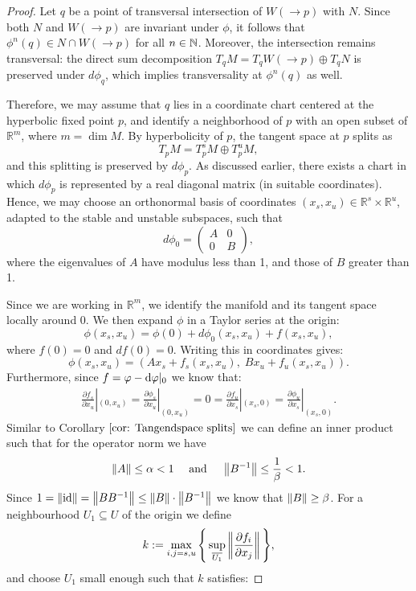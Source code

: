 	\begin{proof}
		Let \( q \) be a point of transversal intersection of \( W(\to p) \) with \( N \). Since both \( N \) and \( W(\to p) \) are invariant under \( \phi \), it follows that \( \phi^n(q) \in N \cap W(\to p) \) for all \( n \in \mathbb{N} \). Moreover, the intersection remains transversal: the direct sum decomposition \( T_q M = T_q W(\to p) \oplus T_q N \) is preserved under \( d\phi_q \), which implies transversality at \( \phi^n(q) \) as well.
		
		Therefore, we may assume that \( q \) lies in a coordinate chart centered at the hyperbolic fixed point \( p \), and identify a neighborhood of \( p \) with an open subset of \( \mathbb{R}^m \), where \( m = \dim M \). By hyperbolicity of \( p \), the tangent space at \( p \) splits as
		\[
		T_p M = T^s_p M \oplus T^u_p M,
		\]
		and this splitting is preserved by \( d\phi_p \). As discussed earlier, there exists a chart in which \( d\phi_p \) is represented by a real diagonal matrix (in suitable coordinates). Hence, we may choose an orthonormal basis of coordinates \( (x_s, x_u) \in \mathbb{R}^s \times \mathbb{R}^u \), adapted to the stable and unstable subspaces, such that
		\[
		d\phi_0 =
		\begin{pmatrix}
			A & 0 \\
			0 & B
		\end{pmatrix},
		\]
		where the eigenvalues of \( A \) have modulus less than 1, and those of \( B \) greater than 1.
		
		Since we are working in \( \mathbb{R}^m \), we identify the manifold and its tangent space locally around 0. We then expand \( \phi \) in a Taylor series at the origin:
		\[
		\phi(x_s, x_u) = \phi(0) + d\phi_0(x_s, x_u) + f(x_s, x_u),
		\]
		where \( f(0) = 0 \) and \( df(0) = 0 \). Writing this in coordinates gives:
		\begin{equation} \label{eq: proof of Lambda lemma phi split}
			\phi(x_s, x_u) = (A x_s + f_s(x_s, x_u),\; B x_u + f_u(x_s, x_u)).
		\end{equation}
  Furthermore, since $f=\varphi-\mathop{}\!\mathrm{d} \varphi|_0$ we know that: 
		\begin{align*}
			\frac{\partial f_s}{\partial x_u}|_{(0,x_u)}=\frac{\partial \phi_s}{\partial x_u}|_{(0,x_u)}=0=\frac{\partial f_u}{\partial x_s}|_{(x_s,0)}=\frac{\partial \phi_u}{\partial x_s}|_{(x_s,0)}.
		\end{align*} Similar to Corollary $\ref{cor: Tangendspace splits}$ we can define an inner product such that for the operator norm we have 
		\begin{align*}
			\left\lVert A\right\rVert\leq \alpha <1 \quad \text{ and } \quad \left\lVert B^{-1}\right\rVert\leq \frac{1}{\beta} <1.
		\end{align*}
		Since $1=\left\lVert\operatorname{\text{id}}\right\rVert=\left\lVert BB^{-1}\right\rVert\leq \left\lVert B\right\rVert\cdot \left\lVert B^{-1}\right\rVert$ we know that $\left\lVert B\right\rVert\geq \beta$.
		For a neighbourhood $U_1\subseteq U$ of the origin we define 
		\begin{align*}
			k:=\max_{i,j=s,u} \Bigg\{ \sup_{\overline{U_1}}\left\lVert\frac{\partial f_i}{\partial x_j}\right\rVert \Bigg\},
		\end{align*} and choose $U_1$ small enough such that $k$ satisfies:
		

\end{proof}
